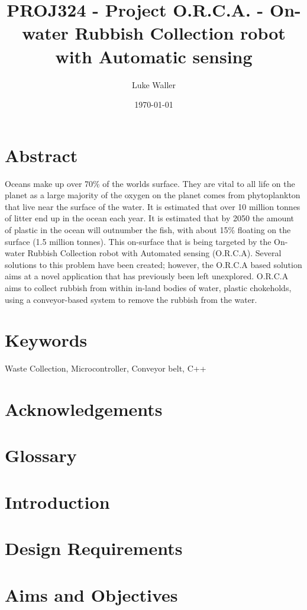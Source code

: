 \documentclass [11pt]{article}
\begin{document}
							
\title{\bf PROJ324 - Project O.R.C.A. - On-water Rubbish Collection robot with Automatic sensing} 	
\author{Luke Waller} 								
\date{\today} 										
\maketitle
\thispagestyle{empty}

\newpage 	

\section*{Abstract}

Oceans make up over 70\% of the worlds surface. They are vital to all life on the planet as a large majority of the oxygen on the planet comes from phytoplankton that live near the surface of the water. It is estimated that over 10 million tonnes of litter end up in the ocean each year. It is estimated that by 2050 the amount of plastic in the ocean will outnumber the fish, with about 15\% floating on the surface (1.5 million tonnes). This on-surface that is being targeted by the On-water Rubbish Collection robot with Automated sensing (O.R.C.A). 
Several solutions to this problem have been created; however, the O.R.C.A based solution aims at a novel application that has previously been left unexplored. O.R.C.A aims to collect rubbish from within in-land bodies of water, plastic chokeholds, using a conveyor-based system to remove the rubbish from the water. 

\section*{Keywords} 
Waste Collection, Microcontroller, Conveyor belt, C++

\newpage
\section*{Acknowledgements}
											
		
\newpage			
{}
\setcounter{page}{1}
\tableofcontents 
\newpage

\listoffigures
\listoftables

\newpage

\section{Glossary}
\newpage
\section{Introduction}
\section{Design Requirements}
\section{Aims and Objectives}
\end{document}
